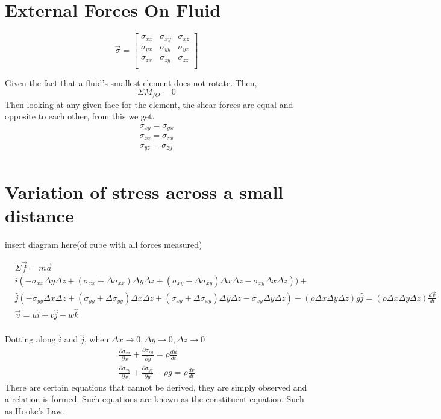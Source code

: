 \documentclass{report}
\begin{document}
\section{External Forces On Fluid}
\[
  \vec{\sigma} =
  \begin{bmatrix}
    \sigma_{xx} & \sigma_{xy} & \sigma_{xz} \\
    \sigma_{yx} & \sigma_{yy} & \sigma_{yz} \\
    \sigma_{zx} & \sigma_{zy} & \sigma_{zz} \\
  \end{bmatrix}
\]

Given the fact that a fluid's smallest element does not rotate. Then,
\[
  \Sigma M_{/O} = 0
\]
Then looking at any given face for the element, the shear forces are equal and opposite to each other, from this we get. 
\begin{align*}
  \sigma_{xy} = \sigma_{yx} \\ 
  \sigma_{xz} = \sigma_{zx} \\ 
  \sigma_{yz} = \sigma_{zy} \\
\end{align*}

\section{Variation of stress across a small distance}
insert diagram here(of cube with all forces measured)

\begin{align*}
  &\Sigma \vec{f} = m \vec{a} \\
  &\hat{i}(-\sigma_{xx} \Delta y \Delta z + (\sigma_{xx} + \Delta\sigma_{xx})\Delta y \Delta z + (\sigma_{xy} + \Delta \sigma_{xy})\Delta x \Delta z - \sigma_{xy}\Delta x \Delta z))  + \\
  &\hat{j}(-\sigma_{yy} \Delta x \Delta z + (\sigma_{yy} + \Delta \sigma_{yy}) \Delta x \Delta z + (\sigma_{xy}+\Delta \sigma_{xy})\Delta y \Delta z - \sigma_{xy} \Delta y \Delta z) - (\rho \Delta x \Delta y \Delta z)g \hat{j} =  (\rho \Delta x \Delta y \Delta z)\frac{d \vec{v}}{dt}\\ 
  &\vec{v} = u \hat{i} + v \hat{j} + w \hat{k}  \\
\end{align*}

Dotting along $\hat{i}$ and $\hat{j}$, when $\Delta x \rightarrow 0, \Delta y \rightarrow 0, \Delta z \rightarrow 0$
\begin{align*}
  \frac{\partial \sigma_{xx}}{\partial x} + \frac{\partial \sigma_{xy}}{\partial y} = \rho \frac{du}{dt} \\
  \frac{\partial \sigma_{xy}}{\partial x} + \frac{\partial \sigma_{yy}}{\partial y} - \rho g = \rho \frac{dv}{dt}
\end{align*}
There are certain equations that cannot be derived, they are simply observed and a relation is formed. Such equations are known as the constituent equation. Such as Hooke's Law. 
\end{document}
